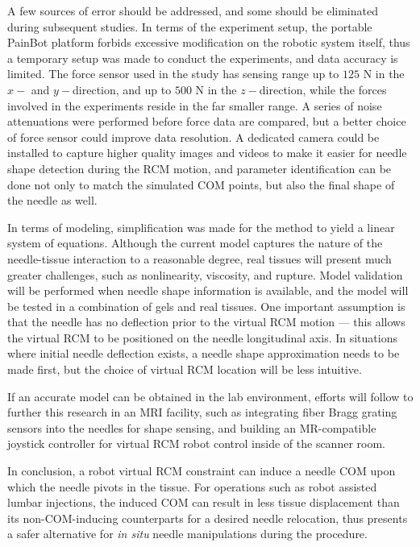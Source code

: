 A few sources of error should be addressed, and some should be eliminated during subsequent studies. In terms of the experiment setup, the portable PainBot platform forbids excessive modification on the robotic system itself, thus a temporary setup was made to conduct the experiments, and data accuracy is limited. The force sensor used in the study has sensing range up to $125$ N in the $x-$ and $y-$direction, and up to $500$ N in the $z-$direction, while the forces involved in the experiments reside in the far smaller range. A series of noise attenuations were performed before force data are compared, but a better choice of force sensor could improve data resolution. A dedicated camera could be installed to capture higher quality images and videos to make it easier for needle shape detection during the RCM motion, and parameter identification can be done not only to match the simulated COM points, but also the final shape of the needle as well.

In terms of modeling, simplification was made for the method to yield a linear system of equations. Although the current model captures the nature of the needle-tissue interaction to a reasonable degree, real tissues will present much greater challenges, such as nonlinearity, viscosity, and rupture. Model validation will be performed when needle shape information is available, and the model will be tested in a combination of gels and real tissues. One important assumption is that the needle has no deflection prior to the virtual RCM motion --- this allows the virtual RCM to be positioned on the needle longitudinal axis. In situations where initial needle deflection exists, a needle shape approximation needs to be made first, but the choice of virtual RCM location will be less intuitive.

If an accurate model can be obtained in the lab environment, efforts will follow to further this research in an MRI facility, such as integrating fiber Bragg grating sensors into the needles for shape sensing, and building an MR-compatible joystick controller for virtual RCM robot control inside of the scanner room.

In conclusion, a robot virtual RCM constraint can induce a needle COM upon which the needle pivots in the tissue. For operations such as robot assisted lumbar injections, the induced COM can result in less tissue displacement than its non-COM-inducing counterparts for a desired needle relocation, thus presents a safer alternative for \textit{in situ} needle manipulations during the procedure. 

